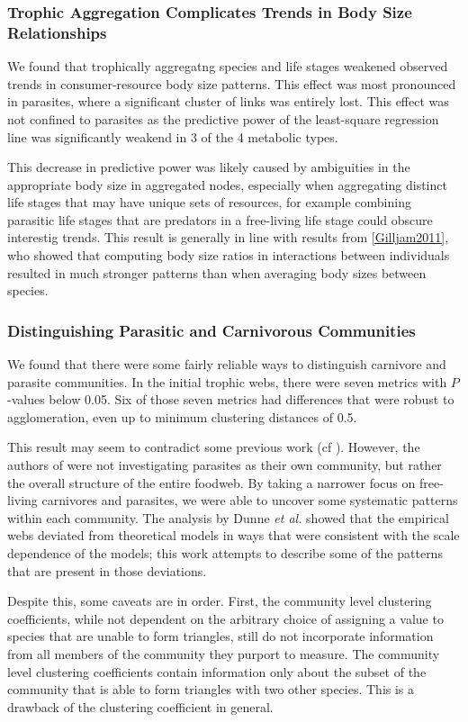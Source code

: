 \documentclass[../dissertation.tex]{subfiles}
\begin{document}
\subsubsection{Trophic Aggregation Complicates Trends in Body Size
Relationships} We found that trophically aggregatng species and life stages
weakened observed trends in consumer-resource body size patterns. This effect
was most pronounced in parasites, where a significant cluster of links was
entirely lost. This effect was not confined to parasites as the predictive
power of the least-square regression line was significantly weakend in 3 of the
4 metabolic types. 

This decrease in predictive power was likely caused by ambiguities in the
appropriate body size in aggregated nodes, especially when aggregating distinct
life stages that may have unique sets of resources, for example combining
parasitic life stages that are predators in a free-living life stage could
obscure interestig trends. This result is generally in line with results from
\ref{Gilljam2011}, who showed that computing body size ratios in interactions
between individuals resulted in much stronger patterns than when averaging body
sizes between species. 

\subsubsection{Distinguishing Parasitic and Carnivorous Communities} 
We found that there were some fairly reliable ways to distinguish carnivore and
parasite communities. In the initial trophic webs, there were seven metrics with
$P$-values below 0.05. Six of those seven metrics had differences that were
robust to agglomeration, even up to minimum clustering distances of 0.5.

This result may seem to contradict some previous work (cf \cite{Dunne2013}).
However, the authors of \cite{Dunne2013} were not investigating parasites as
their own community, but rather the overall structure of the entire foodweb.
By taking a narrower focus on free-living carnivores and parasites, we were
able to uncover some systematic patterns within each community. The analysis by
Dunne \textit{et al.} showed that the empirical webs deviated from theoretical
models in ways that were consistent with the scale dependence of the models;
this work attempts to describe some of the patterns that are present in those
deviations. 

Despite this, some caveats are in order. First, the community level clustering
coefficients, while not dependent on the arbitrary choice of assigning a value
to species that are unable to form triangles, still do not incorporate
information from all members of the community they purport to measure. The
community level clustering coefficients contain information only about the
subset of the community that is able to form triangles with two other species.
This is a drawback of the clustering coefficient in general. 
\end{document}
